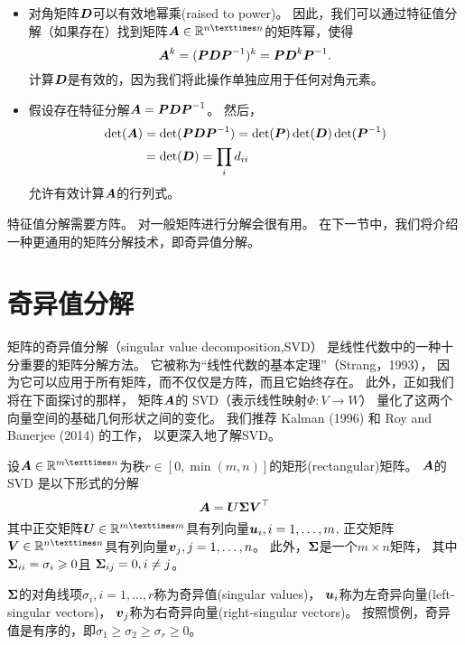 \begin{itemize}
\item
对角矩阵$\boldsymbol{D}$可以有效地幂乘(raised to power)。
因此，我们可以通过特征值分解（如果存在）找到矩阵$\A \in \R^{n×n}$的矩阵幂，使得
\begin{equation}
    \boldsymbol{A}^k = (\boldsymbol{P}\boldsymbol{D}\boldsymbol{P}^{-1})^k = \boldsymbol{P}\boldsymbol{D}^k\boldsymbol{P}^{-1}.
\end{equation}
计算$\boldsymbol{D}$是有效的，因为我们将此操作单独应用于任何对角元素。
\item
假设存在特征分解$\boldsymbol{A} = \boldsymbol{P}\boldsymbol{D}\boldsymbol{P}^{-1}$。 然后，
\begin{subequations}
    \begin{align}
        \det(\boldsymbol{A}) &= \det(\boldsymbol{P}\boldsymbol{D}\boldsymbol{P}^{-1}) = \det(\boldsymbol{P})\det(\boldsymbol{D})\det(\boldsymbol{P}^{-1}) \\
        &= \det(\boldsymbol{D}) = \prod_i d_{ii}
    \end{align}
\end{subequations}
允许有效计算$\boldsymbol{A}$的行列式。
\end{itemize}

特征值分解需要方阵。
对一般矩阵进行分解会很有用。
在下一节中，我们将介绍一种更通用的矩阵分解技术，即奇异值分解。

\section{奇异值分解}
矩阵的奇异值分解（singular value decomposition,SVD）
是线性代数中的一种十分重要的矩阵分解方法。
它被称为“线性代数的基本定理”（Strang，1993），
因为它可以应用于所有矩阵，而不仅仅是方阵，而且它始终存在。
此外，正如我们将在下面探讨的那样，
矩阵$\boldsymbol{A}$的 SVD（表示线性映射$\Phi:V \rightarrow W$）
量化了这两个向量空间的基础几何形状之间的变化。
我们推荐 Kalman (1996) 和 Roy and Banerjee (2014) 的工作，
以更深入地了解SVD。

\begin{theorem}[SVD定理]
设$\A \in \R^{m×n}$为秩$r \in [0, \min(m, n)]$的矩形(rectangular)矩阵。
$\boldsymbol{A}$的 SVD 是以下形式的分解
\begin{equation}
    \boldsymbol{A} = \boldsymbol{U} \boldsymbol{\Sigma} \boldsymbol{V}^\top\\
\end{equation}
其中正交矩阵$\U \in \R^{m×m}$具有列向量$\boldsymbol{u}_i, i = 1,\dots, m$,
正交矩阵$\V \in \R^{n×n}$具有列向量$\boldsymbol{v}_j,j = 1,\dots,n$。
此外，$\boldsymbol{\Sigma}$是一个$m × n$矩阵，
其中$\boldsymbol{\Sigma}_{ii} = \sigma_i \geqslant 0$且
$\boldsymbol{\Sigma}_{ij} = 0, i \neq j$。
\end{theorem}

$\boldsymbol{\Sigma}$的对角线项$\sigma_i,i = 1,...,r$称为奇异值(singular values)，
$\boldsymbol{u}_i$称为左奇异向量(left-singular vectors)，
$\boldsymbol{v}_j$称为右奇异向量(right-singular vectors)。
按照惯例，奇异值是有序的，即$\sigma_1 \geqslant \sigma_2 \geqslant \sigma_r \geqslant 0$。


